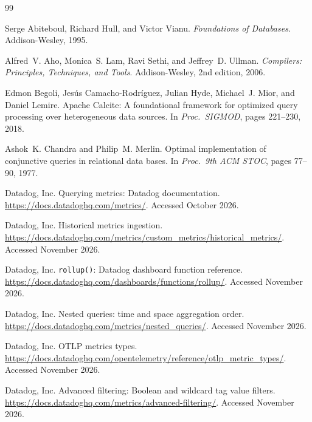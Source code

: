 \begin{thebibliography}{99}

Serge Abiteboul, Richard Hull, and Victor Vianu.
\newblock \emph{Foundations of Databases}. Addison-Wesley, 1995.

Alfred~V. Aho, Monica~S. Lam, Ravi Sethi, and Jeffrey~D. Ullman.
\newblock \emph{Compilers: Principles, Techniques, and Tools}. Addison-Wesley, 2nd edition, 2006.

Edmon Begoli, Jes{\'u}s Camacho-Rodr{\'i}guez, Julian Hyde, Michael~J. Mior, and Daniel Lemire.
\newblock Apache {Calcite}: A foundational framework for optimized query processing over
heterogeneous data sources.
\newblock In \emph{Proc.\ SIGMOD}, pages 221--230, 2018.

Ashok~K. Chandra and Philip~M. Merlin.
\newblock Optimal implementation of conjunctive queries in relational data bases.
\newblock In \emph{Proc.\ 9th ACM STOC}, pages 77--90, 1977.

{Datadog, Inc.}
\newblock Querying metrics: Datadog documentation.
\newblock \url{https://docs.datadoghq.com/metrics/}. Accessed October 2026.

{Datadog, Inc.}
\newblock Historical metrics ingestion.
\newblock \url{https://docs.datadoghq.com/metrics/custom_metrics/historical_metrics/}.
Accessed November 2026.

{Datadog, Inc.}
\newblock \texttt{rollup()}: Datadog dashboard function reference.
\newblock \url{https://docs.datadoghq.com/dashboards/functions/rollup/}.
Accessed November 2026.

{Datadog, Inc.}
\newblock Nested queries: time and space aggregation order.
\newblock \url{https://docs.datadoghq.com/metrics/nested_queries/}.
Accessed November 2026.

{Datadog, Inc.}
\newblock OTLP metrics types.
\newblock \url{https://docs.datadoghq.com/opentelemetry/reference/otlp_metric_types/}.
Accessed November 2026.

{Datadog, Inc.}
\newblock Advanced filtering: Boolean and wildcard tag value filters.
\newblock \url{https://docs.datadoghq.com/metrics/advanced-filtering/}.
Accessed November 2026.


\end{thebibliography}
